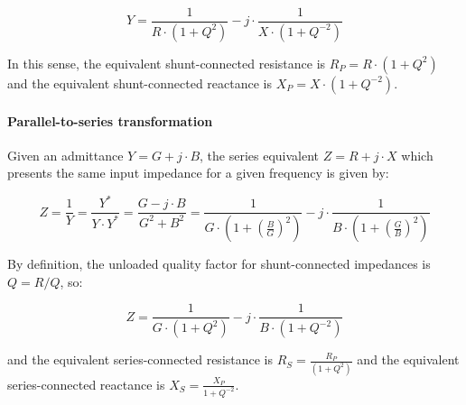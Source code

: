 \begin{equation}
Y = \frac{1}{R \cdot (1 + Q^2)} - j \cdot \frac{1}{X \cdot (1 + Q^{-2})}
\end{equation}

\noindent In this sense, the equivalent shunt-connected resistance is $R_P = R \cdot (1 + Q^2)$ and the equivalent shunt-connected reactance is $X_P = X \cdot (1 + Q^{-2})$.

\paragraph{Parallel-to-series transformation}
Given an admittance $Y = G + j \cdot B$, the series equivalent $Z = R + j \cdot X$ which presents the same input impedance for a given frequency is given by:

\begin{equation}
Z = \frac{1}{Y} = \frac{Y^*}{Y \cdot Y^*} = \frac{G - j \cdot B}{G^2 + B^2} = \frac{1}{G \cdot \left( 1 + \left( \frac{B}{G} \right)^2\right)} - j \cdot \frac{1}{B \cdot \left( 1 + \left( \frac{G}{B} \right)^2\right)} 
\end{equation}

\noindent By definition, the unloaded quality factor for shunt-connected impedances is $Q = R/Q$, so:

\begin{equation}
Z = \frac{1}{G \cdot (1 + Q^2)} - j \cdot \frac{1}{B \cdot (1 + Q^{-2})}
\end{equation}

\noindent and the equivalent series-connected resistance is $R_S = \frac{R_P}{(1 + Q^2)}$ and the equivalent series-connected reactance is $X_S = \frac{X_P} {1 + Q^{-2}}$.

